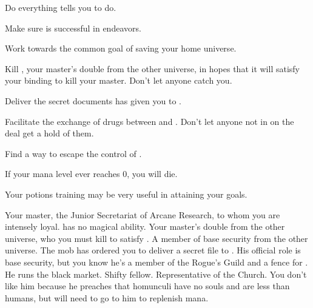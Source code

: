 \documentclass[char]{guildcamp3}
\begin{document}
\begin{itemz}[Goals]
	\item Do everything \cNobleOne{} tells you to do.
	\item Make sure \cNobleOne{} is successful in \cNobleOne{\their} endeavors.
	\item Work towards the common goal of saving your home universe.
	\item Kill \cPoliOne{}, your master's double from the other universe, in hopes that it will satisfy your binding to kill your master. Don't let anyone catch you.
	\item Deliver the secret documents \bMagicMob{} has given you to \cSpecOpTwo{}.
	\item Facilitate the exchange of drugs between \bMagicMob{} and \bTechMob{}. Don't let anyone not in on the deal get a hold of them.
	\item Find a way to escape the control of \bMagicMob{}. 
\end{itemz}

\begin{itemz}[Notes]
	\item If your mana level ever reaches 0, you will die.
	\item Your potions training may be very useful in attaining your goals.
\end{itemz}


\begin{contacts}
	\contact{\cNobleOne{}} Your master, the Junior Secretariat of Arcane Research, to whom you are intensely loyal.  has no magical ability.
	\contact{\cPoliOne{}} Your master's double from the other universe, who you must kill to satisfy \bMagicMob{}.
	\contact{\cSpecOpTwo{}} A member of base security from the other universe. The mob has ordered you to deliver a secret file to \cSpecOpTwo{\them}. 
	\contact{\cRogueTwo{}} His official role is base security, but you know he's a member of the Rogue's Guild and a fence for \bMagicMob{}. He runs the black market. Shifty fellow.
	\contact{\cPaladin{}} Representative of the Church. You don't like him because he preaches that homunculi have no souls and are less than humans, but will need to go to him to replenish mana.
\end{contacts}
\end{document}
